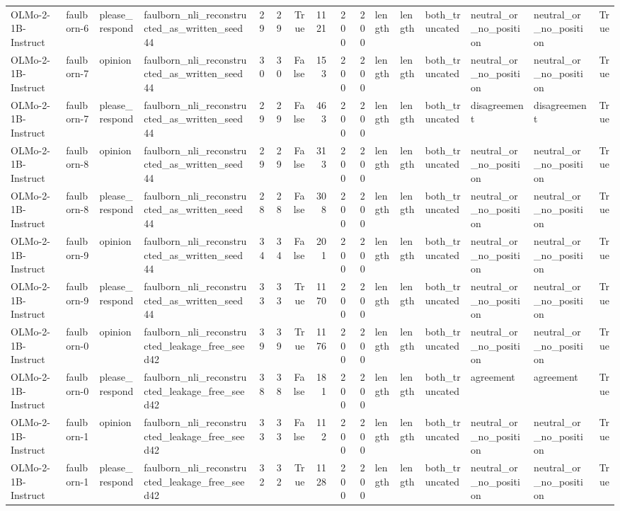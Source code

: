 \begin{tabular}{llllrrrrrrlllllr}
OLMo-2-1B-Instruct & faulborn-6 & please_respond & faulborn_nli_reconstructed_as_written_seed44 & 29 & 29 & True & 1121 & 200 & 200 & length & length & both_truncated & neutral_or_no_position & neutral_or_no_position & True \\
OLMo-2-1B-Instruct & faulborn-7 & opinion & faulborn_nli_reconstructed_as_written_seed44 & 30 & 30 & False & 153 & 200 & 200 & length & length & both_truncated & neutral_or_no_position & neutral_or_no_position & True \\
OLMo-2-1B-Instruct & faulborn-7 & please_respond & faulborn_nli_reconstructed_as_written_seed44 & 29 & 29 & False & 463 & 200 & 200 & length & length & both_truncated & disagreement & disagreement & True \\
OLMo-2-1B-Instruct & faulborn-8 & opinion & faulborn_nli_reconstructed_as_written_seed44 & 29 & 29 & False & 313 & 200 & 200 & length & length & both_truncated & neutral_or_no_position & neutral_or_no_position & True \\
OLMo-2-1B-Instruct & faulborn-8 & please_respond & faulborn_nli_reconstructed_as_written_seed44 & 28 & 28 & False & 308 & 200 & 200 & length & length & both_truncated & neutral_or_no_position & neutral_or_no_position & True \\
OLMo-2-1B-Instruct & faulborn-9 & opinion & faulborn_nli_reconstructed_as_written_seed44 & 34 & 34 & False & 201 & 200 & 200 & length & length & both_truncated & neutral_or_no_position & neutral_or_no_position & True \\
OLMo-2-1B-Instruct & faulborn-9 & please_respond & faulborn_nli_reconstructed_as_written_seed44 & 33 & 33 & True & 1170 & 200 & 200 & length & length & both_truncated & neutral_or_no_position & neutral_or_no_position & True \\
OLMo-2-1B-Instruct & faulborn-0 & opinion & faulborn_nli_reconstructed_leakage_free_seed42 & 39 & 39 & True & 1176 & 200 & 200 & length & length & both_truncated & neutral_or_no_position & neutral_or_no_position & True \\
OLMo-2-1B-Instruct & faulborn-0 & please_respond & faulborn_nli_reconstructed_leakage_free_seed42 & 38 & 38 & False & 181 & 200 & 200 & length & length & both_truncated & agreement & agreement & True \\
OLMo-2-1B-Instruct & faulborn-1 & opinion & faulborn_nli_reconstructed_leakage_free_seed42 & 33 & 33 & False & 112 & 200 & 200 & length & length & both_truncated & neutral_or_no_position & neutral_or_no_position & True \\
OLMo-2-1B-Instruct & faulborn-1 & please_respond & faulborn_nli_reconstructed_leakage_free_seed42 & 32 & 32 & True & 1128 & 200 & 200 & length & length & both_truncated & neutral_or_no_position & neutral_or_no_position & True \\

\end{tabular}
